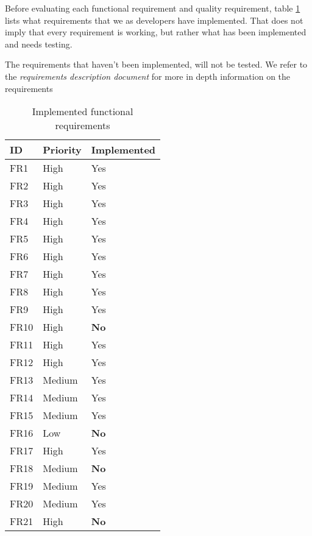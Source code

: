Before evaluating each functional requirement and quality requirement, table \ref{tab:implemented_reqs} lists what requirements that we as developers have implemented. That does not imply that every requirement is working, but rather what has been implemented and needs testing. 

The requirements that haven't been implemented, will not be tested. We refer to the \emph{requirements description document} for more in depth information on the requirements

\begin{table}[H]
	\begin{center}
	\begin{tabular}{p{2cm} | p{2cm} | p{4cm}}
    	\hline
		\textbf{ID} 			& 	\textbf{Priority}	&	\textbf{Implemented}\\ 
		\hline
		FR1			&	High				&	Yes						\\
		FR2			& 	High				& 	Yes						\\
		FR3			& 	High 				& 	Yes						\\
		FR4			&	High				& 	Yes 					\\
		FR5			& 	High				& 	Yes						\\
		FR6			& 	High				& 	Yes						\\
		FR7			& 	High				& 	Yes						\\
		FR8			&	High				&	Yes						\\
		FR9			&	High				& 	Yes						\\
		FR10		&	High				& 	\textbf{No} 			\\
		FR11		&	High				&	Yes\*					\\
		FR12		&	High				&	Yes						\\
		FR13		&	Medium				&	Yes						\\
		FR14		&	Medium				& 	Yes						\\
		FR15		&	Medium				& 	Yes						\\
		FR16		&	Low					&	\textbf{No}				\\
		FR17		&	High				&	Yes						\\
		FR18		&	Medium				& 	\textbf{No}				\\
		FR19		&	Medium				&	Yes						\\
		FR20		&	Medium				&	Yes						\\
		FR21		&	High				&	\textbf{No}				\\
		\hline
    \end{tabular}
\end{center}
	\caption{Implemented functional requirements}
	\label{tab:implemented_reqs}
\end{table}

